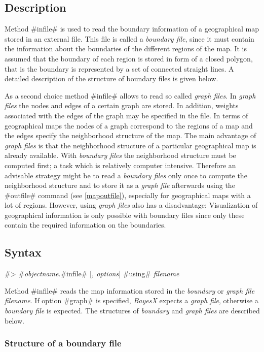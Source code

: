 \subsection{Description}


Method #infile# is used to read the boundary information of a
geographical map stored in an external file. This file is called a
{\em boundary file}, since it must contain the information about
the boundaries of the different regions of the map. It is assumed
that the boundary of each region is stored in form of a closed
polygon, that is the boundary is represented by a set of connected
straight lines. A detailed description of the structure of
boundary files is given below.

As a second choice method #infile# allows to read  so called {\em
graph files}. In {\em graph files} the nodes and edges of a
certain graph are stored. In addition, weights associated with the
edges of the graph may be specified in the file. In terms of
geographical maps the nodes of a graph correspond to the regions
of a map and the edges specify the neighborhood structure of the
map. The main advantage of {\em graph files} is that the
neighborhood structure of a particular geographical map is already
available. With {\em boundary files} the neighborhood structure
must be computed first; a task which is relatively computer
intensive. Therefore an advisable strategy might be to read a {\em
boundary files} only once to compute the neighborhood structure
and to store it as a {\em graph file} afterwards using the
#outfile# command (see \autoref{mapoutfile}), especially for
geographical maps with a lot of regions. However, using {\em graph
files} also has a disadvantage: Visualization of geographical
information is only possible with boundary files since only these
contain the required information on the boundaries.

\subsection{Syntax}

#> #{\em objectname}.#infile# [{\em , options}] #using# {\em filename}

Method #infile# reads the map information stored in the {\em
boundary} or {\em graph file} {\em filename}. If option #graph# is
specified, {\em BayesX} expects a {\em graph file}, otherwise a
{\em boundary file}
is expected. The structures of {\em boundary} and {\em graph files} are described below.

\subsubsection*{Structure of a boundary file}

